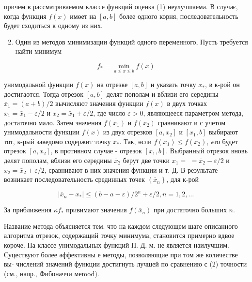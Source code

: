 \documentclass[10pt]{article}
\begin{document}
причем в рассматриваемом классе функций оценка (1) неулучшаема. В случає, когда функция $f(x)$ имөет на $[a, b]$ более одного корня, последовательность будет сходиться к одному из них.



\begin{enumerate}

  \setcounter{enumi}{1}

  \item Один из методов минимизации функций одного переменного, Пусть требуется найти минимум

\end{enumerate}



\[

f_{*}=\min _{a \leqslant x \leqslant b} f(x)

\]



унимодальной функции $f(x)$ на отрезке $[a, b]$ и указать точку $x_{*}$, в к-рой он достигаөтся. Тогда отрезок $[a, b]$ делят пополам и вблизи его середины $\bar{x}_{1}=(a+b) / 2$ вычисляют значения функции $f(x)$ в двух точках $x_{1}=\bar{x}_{1}-\varepsilon / 2$ и $x_{2}=\bar{x}_{1}+\varepsilon / 2$, где число $\varepsilon>0$, являющееся параметром метода, достаточно мало. Затем значения $f\left(x_{1}\right)$ и $f\left(x_{2}\right)$ сравнивают и с учетом унимодальности функции $f(x)$ из двух отрезков $\left[a, x_{2}\right]$ и $\left[x_{1}, b\right]$ выбирают тот, к-рый заведомо содержит точку $x_{*}$. Так, өсли $f\left(x_{1}\right) \leqslant f\left(x_{2}\right)$, әто будет отрезок $\left[a, x_{2}\right]$, в противном случае - отрезок $\left[x_{1}, b\right]$. Выбранный отрезок вновь делят пополам, вблизи его середины $\bar{x}_{2}$ берут две точки $x_{1}=$ $=\bar{x}_{2}-\varepsilon / 2$ и $x_{2}=\bar{x}_{2}+\varepsilon / 2$, сравнивают в них значения функции и т. Д. В результате возникает последовательность срединных точек $\left\{\bar{x}_{n}\right\}$, для к-рой



\[

\left|\bar{x}_{n}-x_{*}\right| \leqslant(b-a-\varepsilon) / 2^{n}+\varepsilon / 2, n=1,2, \ldots

\]



За приближения $\kappa f_{*}$ привимают значения $f\left(\bar{x}_{n}\right)$ при достаточно больших $n$.



Название метода объясняется тем. что на каждом следующем шаге описанного алгоритма отрезок, содержащий точку минимума, становится примерно вдвое короче. На классе унимодальных функций П. Д. м. не является наилучшим. Суцествуют более әффективны е методы, позволяющие при том же количестве вы- числений значений функции достигнуть лучшей по сравнению с (2) точности (см., напр., Фибоначчи меmod).
\end{document}
